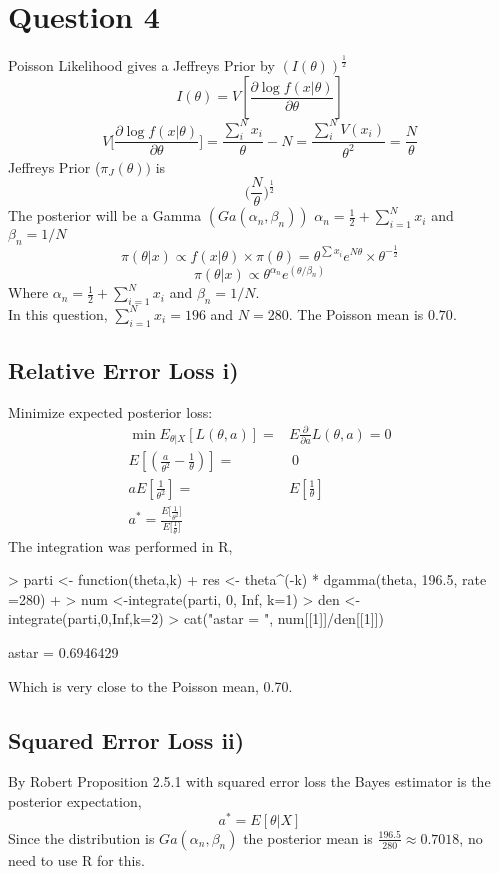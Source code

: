 \documentclass{article}
\begin{document}

\section*{Question 4}
Poisson Likelihood gives a Jeffreys Prior by $ (I(\theta))^{\frac{1}{2}} $
$$
I(\theta) =  V [ \frac{\partial \log f(x|\theta)}{\partial \theta} ]
$$
$$
V \Big[\frac{\partial \log f(x|\theta)}{\partial \theta}\Big] = \frac{\sum_i^N x_i}{\theta} - N =  \frac{\sum_i^N V(x_i)}{\theta^2} = \frac{N}{\theta} 
$$
Jeffreys Prior ($\pi_J(\theta)) $ is 
$$
\Big(\frac{N}{\theta}\Big)^{\frac{1}{2}}
$$
The posterior will be a Gamma $(Ga(\alpha_n, \beta_n))$ $\alpha_n = \frac{1}{2} + \sum_{i=1}^N x_i $ and $\beta_n = 1/N $
$$
\pi(\theta|x) \propto f(x|\theta)\times \pi(\theta) =  \theta^{\sum x_i} e^{N\theta} \times \theta^{-\frac{1}{2}}
$$
$$
\pi(\theta|x) \propto \theta^{\alpha_n} e^{(\theta/\beta_n)}
$$
Where $\alpha_n = \frac{1}{2} + \sum_{i=1}^N x_i $ and $\beta_n = 1/N $.
\\
In this question, $ \sum_{i=1}^N x_i = 196 $  and $ N = 280 $. The Poisson mean is $ 0.70 $. 

\subsection*{Relative Error Loss i)}
Minimize expected posterior loss:
\begin{align*}
\min E_{\theta|X}[L(\theta, a)] = & E \frac{\partial}{\partial a} L(\theta, a) = 0\\ 
 E[ (\frac{a}{\theta^2} - \frac{1}{\theta})] = & \ 0 \\
 a E[\frac{1}{\theta^2}] = & E[\frac{1}{\theta}] \\ 
 a^* = \frac{E \Big[\frac{1}{\theta^2}\Big]  }{E\Big[ \frac{1}{\theta} \Big]}
\end{align*}
The integration was performed in R, 
\begin{Schunk}
\begin{Sinput}
> parti <- function(theta,k){
+   res <- theta^(-k) * dgamma(theta, 196.5, rate =280)
+ }
> num <-integrate(parti, 0, Inf, k=1)
> den <- integrate(parti,0,Inf,k=2)
> cat("astar = ", num[[1]]/den[[1]])
\end{Sinput}
\begin{Soutput}
astar =  0.6946429
\end{Soutput}
\end{Schunk}
Which is very close to the Poisson mean, 0.70.
\subsection*{Squared Error Loss ii)}
By Robert Proposition 2.5.1 with squared error loss the Bayes estimator is the posterior expectation,
$$
a^* = E[\theta|X]
$$
Since the  distribution is $Ga(\alpha_n, \beta_n)$ the posterior mean is $\frac{196.5}{280} \approx 0.7018$, no need to use R for this.
\end{document}
